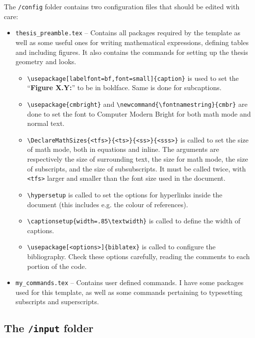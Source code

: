 The \texttt{/config} folder contains two configuration files that should be edited with care:
%
\begin{itemize}
\item \texttt{thesis\_preamble.tex} -- Contains all packages required by the template as well as some useful ones for writing mathematical expressions, defining tables and including figures. It also contains the commands for setting up the thesis geometry and looks.

\begin{itemize}
	\item \Verb*|\usepackage[labelfont=bf,font=small]{caption}| is used to set the ``\textbf{Figure X.Y:}'' to be in boldface. Same is done for subcaptions.
	\item \Verb*|\usepackage{cmbright}| and \Verb*|\newcommand{\fontnamestring}{cmbr}| are done to set the font to Computer Modern Bright for both math mode and normal text.
	\item \Verb*|\DeclareMathSizes{<tfs>}{<ts>}{<ss>}{<sss>}| is called to set the size of math mode, both in equations and inline. The arguments are respectively the size of surrounding text, the size for math mode, the size of subscripts, and the size of subsubscripts. It must be called twice, with \verb+<tfs>+ larger and smaller than the font size used in the document.
	\item \Verb*|\hypersetup| is called to set the options for hyperlinks inside the document (this includes e.g. the colour of references).
	\item \Verb*|\captionsetup{width=.85\textwidth}| is called to define the width of captions.
	\item \Verb*|\usepackage[<options>]{biblatex}| is called to configure the bibliography. Check these options carefully, reading the comments to each portion of the code.
\end{itemize}


\item \texttt{my\_commands.tex} -- Contains user defined commands. I have some packages used for this template, as well as some commands pertaining to typesetting subscripts and superscripts.
\end{itemize}

\subsection{The {\normalfont\texttt{/input}} folder} %


